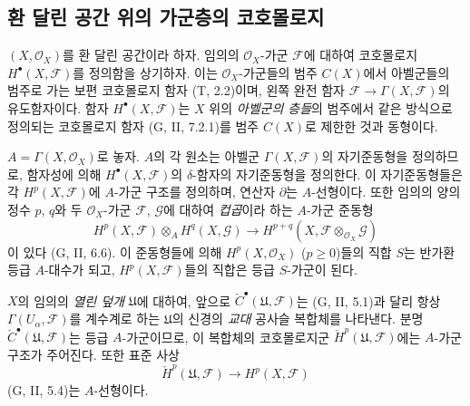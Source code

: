 \subsection{환 달린 공간 위의 가군층의 코호몰로지}
\label{subsection:0.12.1-fr}

\begin{env}[12.1.1]
\label{0.12.1.1-fr}
$(X,\mathcal O_X)$를 환 달린 공간이라 하자. 임의의
$\mathcal O_X$-가군 $\mathcal F$에 대하여 코호몰로지
$H^\bullet(X,\mathcal F)$를 정의함을 상기하자. 이는
$\mathcal O_X$-가군들의 범주 $C(X)$에서 아벨군들의 범주로 가는
보편 코호몰로지 함자 (T, 2.2)이며, 왼쪽 완전 함자
$\mathcal F\to\Gamma(X,\mathcal F)$의 유도함자이다. 함자
$H^\bullet(X,\mathcal F)$는
$X$ 위의 \emph{아벨군의 층들}의 범주에서 같은 방식으로 정의되는
코호몰로지 함자 (G, II, 7.2.1)를 범주 $C(X)$로 제한한 것과 동형이다.
\end{env}

\begin{env}[12.1.2]
\label{0.12.1.2-fr}
$A=\Gamma(X,\mathcal O_X)$로 놓자. $A$의 각 원소는 아벨군
$\Gamma(X,\mathcal F)$의 자기준동형을 정의하므로, 함자성에 의해
$H^\bullet(X,\mathcal F)$의 $\delta$-함자의 자기준동형을 정의한다.
이 자기준동형들은 각 $H^p(X,\mathcal F)$에 $A$-가군 구조를 정의하며,
연산자 $\partial$는 $A$-선형이다. 또한 임의의 양의 정수 $p$, $q$와
두 $\mathcal O_X$-가군 $\mathcal F$, $\mathcal G$에 대하여
\emph{컵곱}이라 하는 $A$-가군 준동형
\[
\label{0.12.1.2.1-fr}
\tag{12.1.2.1}
H^p(X,\mathcal F)\otimes_A H^q(X,\mathcal G)
\longrightarrow H^{p+q}(X,\mathcal F\otimes_{\mathcal O_X}\mathcal G)
\]
이 있다 (G, II, 6.6). 이 준동형들에 의해 $H^p(X,\mathcal O_X)$
($p\geq0$)들의 직합 $S$는 반가환 등급 $A$-대수가 되고,
$H^p(X,\mathcal F)$들의 직합은 등급 $S$-가군이 된다.

$X$의 임의의 \emph{열린 덮개} $\mathfrak U$에 대하여, 앞으로
$\check C^\bullet(\mathfrak U,\mathcal F)$는 (G, II, 5.1)과 달리 항상
$\Gamma(U_\alpha,\mathcal F)$를 계수계로 하는 $\mathfrak U$의 신경의
\emph{교대} 공사슬 복합체를 나타낸다. 분명
$\check C^\bullet(\mathfrak U,\mathcal F)$는 등급 $A$-가군이므로,
이 복합체의 코호몰로지군 $\check H^p(\mathfrak U,\mathcal F)$에는
$A$-가군 구조가 주어진다. 또한 표준 사상
\[
\check H^p(\mathfrak U,\mathcal F)\longrightarrow H^p(X,\mathcal F)
\]
(G, II, 5.4)는 $A$-선형이다.
\end{env}

